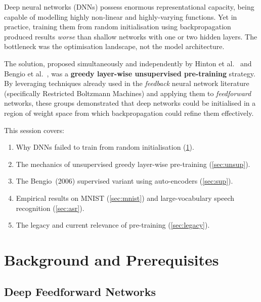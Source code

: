 \documentclass[12pt,a4paper]{article}
\begin{document}
\begin{keyinsight}[title=The Core Problem Before 2006]
  Deep neural networks (DNNs) possess enormous representational capacity,
  being capable of modelling highly non-linear and highly-varying functions.
  Yet in practice, training them from random initialisation using
  backpropagation produced results \emph{worse} than shallow networks with
  one or two hidden layers.  The bottleneck was the optimisation landscape,
  not the model architecture.
\end{keyinsight}

The solution, proposed simultaneously and independently by Hinton et al.\
\cite{hinton2006} and Bengio et al.\ \cite{bengio2006}, was a
\textbf{greedy layer-wise unsupervised pre-training} strategy.  By leveraging
techniques already used in the \emph{feedback} neural network literature
(specifically Restricted Boltzmann Machines) and applying them to
\emph{feedforward} networks, these groups demonstrated that deep networks could
be initialised in a region of weight space from which backpropagation could
refine them effectively.

This session covers:
\begin{enumerate}[leftmargin=*, label=\arabic*.]
  \item Why DNNs failed to train from random initialisation (\cref{sec:background}).
  \item The mechanics of unsupervised greedy layer-wise pre-training (\cref{sec:unsup}).
  \item The Bengio~(2006) supervised variant using auto-encoders (\cref{sec:sup}).
  \item Empirical results on MNIST (\cref{sec:mnist}) and large-vocabulary speech recognition (\cref{sec:asr}).
  \item The legacy and current relevance of pre-training (\cref{sec:legacy}).
\end{enumerate}

\newpage

\section{Background and Prerequisites}
\label{sec:background}

\subsection{Deep Feedforward Networks}
\end{document}
